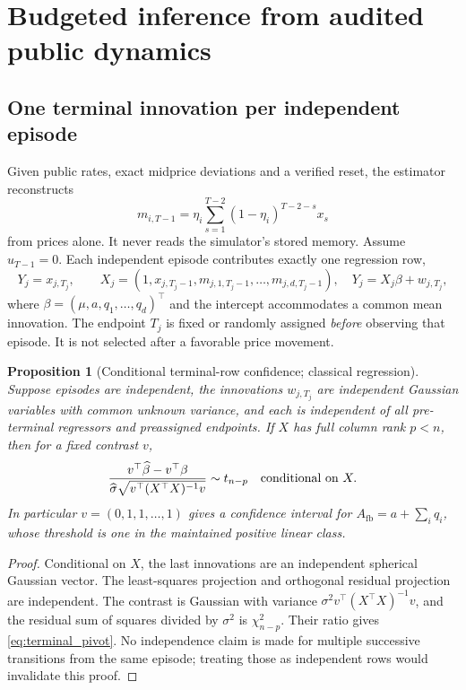 \documentclass[11pt,a4paper]{article}
\newtheorem{proposition}[theorem]{Proposition}
\theoremstyle{definition}
\theoremstyle{remark}
\begin{document}
\section{Budgeted inference from audited public dynamics}
\label{sec:budgeted_audit}
\subsection{One terminal innovation per independent episode}
Given public rates, exact midprice deviations and a verified reset, the estimator reconstructs
\begin{equation}
 m_{i,T-1}=\eta_i\sum_{s=1}^{T-2}(1-\eta_i)^{T-2-s}x_s
 \label{eq:observable_memory}
\end{equation}
from prices alone. It never reads the simulator's stored memory. Assume $u_{T-1}=0$. Each independent episode contributes exactly one regression row,
\begin{equation}
 Y_j=x_{j,T_j},\qquad
 X_j=(1,x_{j,T_j-1},m_{j,1,T_j-1},\ldots,m_{j,d,T_j-1}),
 \quad Y_j=X_j\beta+w_{j,T_j},
 \label{eq:terminal_regression}
\end{equation}
where $\beta=(\mu,a,q_1,\ldots,q_d)^\top$ and the intercept accommodates a common mean innovation. The endpoint $T_j$ is fixed or randomly assigned \emph{before} observing that episode. It is not selected after a favorable price movement.

\begin{proposition}[Conditional terminal-row confidence; classical regression]
\label{prop:terminal_confidence}
Suppose episodes are independent, the innovations $w_{j,T_j}$ are independent Gaussian variables with common unknown variance, and each is independent of all pre-terminal regressors and preassigned endpoints. If $X$ has full column rank $p<n$, then for a fixed contrast $v$,
\begin{equation}
 \frac{v^\top\widehat\beta-v^\top\beta}
 {\widehat\sigma\sqrt{v^\top(X^\top X)^{-1}v}}
 \sim t_{n-p}\quad\hbox{conditional on }X.
 \label{eq:terminal_pivot}
\end{equation}
In particular $v=(0,1,1,\ldots,1)$ gives a confidence interval for
$A_{\mathrm{fb}}=a+\sum_iq_i$, whose threshold is one in the maintained positive linear class.
\end{proposition}
\begin{proof}
Conditional on $X$, the last innovations are an independent spherical Gaussian vector. The least-squares projection and orthogonal residual projection are independent. The contrast is Gaussian with variance $\sigma^2v^\top(X^\top X)^{-1}v$, and the residual sum of squares divided by $\sigma^2$ is $\chi^2_{n-p}$. Their ratio gives \cref{eq:terminal_pivot}. No independence claim is made for multiple successive transitions from the same episode; treating those as independent rows would invalidate this proof.
\end{proof}
\end{document}
